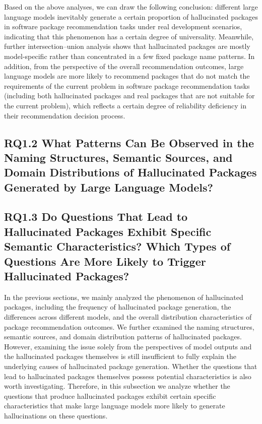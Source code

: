 Based on the above analyses, we can draw the following conclusion: different large language models inevitably generate a certain proportion of hallucinated 
packages in software package recommendation tasks under real development scenarios, indicating that this phenomenon has a certain degree of universality. Meanwhile, 
further intersection–union analysis shows that hallucinated packages are mostly model-specific rather than concentrated in a few fixed package name patterns. 
In addition, from the perspective of the overall recommendation outcomes, large language models are more likely to recommend packages that do not match the 
requirements of the current problem in software package recommendation tasks (including both hallucinated packages and real packages that are not suitable for 
the current problem), which reflects a certain degree of reliability deficiency in their recommendation decision process.

\subsection{RQ1.2 What Patterns Can Be Observed in the Naming Structures, Semantic Sources, and Domain Distributions of Hallucinated Packages Generated by Large Language Models?}

\subsection{RQ1.3 Do Questions That Lead to Hallucinated Packages Exhibit Specific Semantic Characteristics? Which Types of Questions Are More Likely to Trigger Hallucinated Packages?}

In the previous sections, we mainly analyzed the phenomenon of hallucinated packages, including the frequency of hallucinated package generation, the differences 
across different models, and the overall distribution characteristics of package recommendation outcomes. We further examined the naming structures, semantic 
sources, and domain distribution patterns of hallucinated packages. However, examining the issue solely from the perspectives of model outputs and the hallucinated 
packages themselves is still insufficient to fully explain the underlying causes of hallucinated package generation. Whether the questions that lead to 
hallucinated packages themselves possess potential characteristics is also worth investigating. Therefore, in this subsection we analyze whether the questions 
that produce hallucinated packages exhibit certain specific characteristics that make large language models more likely to generate hallucinations on these questions.

